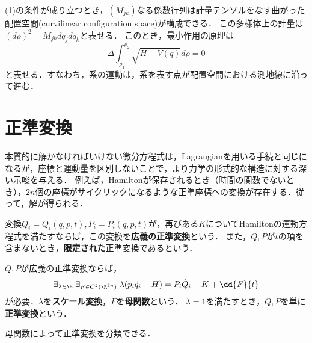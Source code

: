 \documentclass[uplatex,dvipdfmx]{jsreport}
\begin{document}
\begin{theorem}[Jacobi形の最小作用の原理]
    (1)の条件が成り立つとき，$(M_{jk})$なる係数行列は計量テンソルをなす曲がった配置空間(curvilinear configuration space)が構成できる．
    この多様体上の計量は$(d\rho)^2=M_{jk}dq_jdq_k$と表せる．
    このとき，最小作用の原理は
    \[\Delta\int^{\rho_2}_{\rho_1}\sqrt{H-V(q)}d\rho=0\]
    と表せる．すなわち，系の運動は，系を表す点が配置空間における測地線に沿って進む．
\end{theorem}

\section{正準変換}

\begin{tcolorbox}[colframe=ForestGreen, colback=ForestGreen!10!white,breakable,colbacktitle=ForestGreen!40!white,coltitle=black,fonttitle=\bfseries\sffamily,
title=]
    本質的に解かなければいけない微分方程式は，Lagrangianを用いる手続と同じになるが，座標と運動量を区別しないことで，より力学の形式的な構造に対する深い示唆を与える．
    例えば，Hamiltonが保存されるとき（時間の関数でないとき），$2n$個の座標がサイクリックになるような正準座標への変換が存在する．従って，解が得られる．
\end{tcolorbox}

\begin{definition}
    変換$Q_i=Q_i(q,p,t),P_i=P_i(q,p,t)$が，再びある$K$についてHamiltonの運動方程式を満たすならば，この変換を\textbf{広義の正準変換}という．
    また，$Q,P$が$t$の項を含まないとき，\textbf{限定された}正準変換であるという．
\end{definition}

\begin{lemma}[正準変換の正規化と母関数による定式化]
    $Q,P$が広義の正準変換ならば，
    \[\exists_{\lambda\in\R}\;\exists_{F\in C^2(\R^{2n})}\;\lambda(p_i\dot{q}_i-H)=P_i\dot{Q}_i-K+\dd{F}{t}\]
    が必要．$\lambda$を\textbf{スケール変換}，$F$を\textbf{母関数}という．
    $\lambda=1$を満たすとき，$Q,P$を単に\textbf{正準変換}という．
\end{lemma}
\begin{remarks}
    母関数によって正準変換を分類できる．
\end{remarks}
\end{document}

